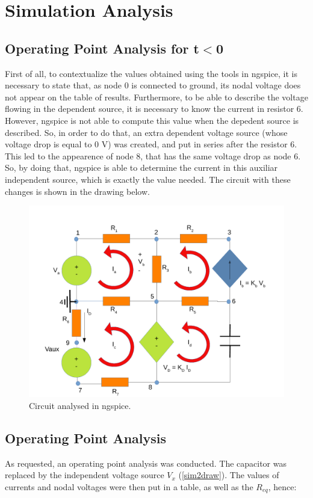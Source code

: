 \section{Simulation Analysis}\label{section:sim}

\subsection{Operating Point Analysis for t$<$0}

First of all, to contextualize the values obtained using the tools in ngspice, it is necessary to state that, as node 0 is connected to ground, its nodal voltage does not appear on the table of results. Furthermore, to be able to describe the voltage flowing in the dependent source, it is necessary to know the current in resistor 6. However, ngspice is not able to compute this value when the depedent source is described. So, in order to do that, an extra dependent voltage source (whose voltage drop is equal to 0 V) was created, and put in series after the resistor 6. This led to the appearence of node 8, that has the same voltage drop as node 6. So, by doing that, ngspice is able to determine the current in this auxiliar independent source, which is exactly the value needed.
 The circuit with these changes is shown in the drawing below.

\begin{figure}[ht] \centering
\includegraphics[width=0.8\linewidth]{sim1draw.pdf}
\caption{Circuit analysed in ngspice.}
\label{simdraw}
\end{figure}

\subsection{Operating Point Analysis}
As requested, an operating point analysis was conducted. The capacitor was replaced by the independent voltage source $V_{x}$ (\ref{sim2draw}). The values of currents and nodal voltages  were then put in a table, as well as the $R_{eq}$, hence:

